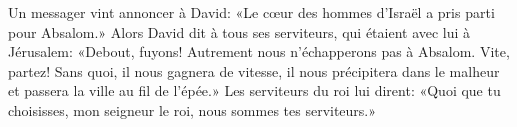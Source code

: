Un messager vint annoncer à David:
	«Le cœur des hommes d’Israël a pris parti pour Absalom.»
Alors David dit à tous ses serviteurs, qui étaient avec lui à Jérusalem:
	«Debout, fuyons! Autrement nous n’échapperons pas à Absalom.
Vite, partez! Sans quoi, il nous gagnera de vitesse,
	il nous précipitera dans le malheur et passera la ville au fil de l’épée.»
Les serviteurs du roi lui dirent:
	«Quoi que tu choisisses, mon seigneur le roi, nous sommes tes serviteurs.»
